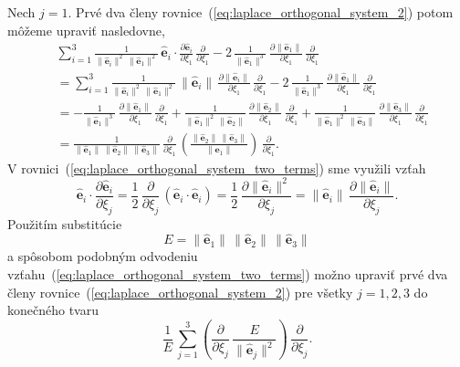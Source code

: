 \documentclass[a4paper, 12pt]{book}
\let\vec\mathbf
\begin{document}
Nech $j = 1$.  Prvé dva členy rovnice~(\ref{eq:laplace_orthogonal_system_2}) 
potom môžeme upraviť nasledovne,
%
\begin{equation}
\label{eq:laplace_orthogonal_system_two_terms}
\begin{split}
&\sum_{i = 1}^{3} \frac{1}{\| \hat{\vec e}_i \|^2 \, \| \hat{\vec e}_1 \|^2} \, 
\hat{\vec e}_i \cdot \frac{\partial \hat{\vec e}_i}{\partial \xi_1} \, 
\frac{\partial}{\partial \xi_1}
- 2\, \frac{1}{\|\hat{\vec e}_1 \|^3} \, \frac{\partial \| \hat{\vec e}_1 
\|}{\partial \xi_1} \, \frac{\partial}{\partial \xi_1}\\
%
&= \sum_{i = 1}^{3} \frac{1}{\| \hat{\vec e}_i \|^2 \, \| \hat{\vec e}_1 \|^2} 
\, \| \hat{\vec e}_i \| \, \frac{\partial \| \hat{\vec e}_i \|}{\partial \xi_1} 
\, \frac{\partial}{\partial \xi_1}
- 2\, \frac{1}{\|\hat{\vec e}_1 \|^3} \, \frac{\partial \| \hat{\vec e}_1 
\|}{\partial \xi_1} \, \frac{\partial}{\partial \xi_1}\\
%
&= -\frac{1}{\| \hat{\vec e}_1 \|^3} \, \frac{\partial \| \hat{\vec e}_1 
\|}{\partial \xi_1} \, \frac{\partial}{\partial \xi_1} + \frac{1}{\| \hat{\vec 
e}_1 \|^2 \, \| \hat{\vec e}_2 \|} \, \frac{\partial \| \hat{\vec e}_2 
\|}{\partial \xi_1} \, \frac{\partial}{\partial \xi_1} + \frac{1}{\| \hat{\vec 
e}_1 \|^2 \, \| \hat{\vec e}_3 \|} \, \frac{\partial \| \hat{\vec e}_3 
\|}{\partial \xi_1} \, \frac{\partial}{\partial \xi_1}\\
%
&= \frac{1}{\| \hat{\vec e}_1 \| \, \| \hat{\vec e}_2 \| \, \| \hat{\vec e}_3 
\|} \, \frac{\partial}{\partial \xi_1} \, \left( \frac{\| \hat{\vec e}_2 \| \, 
\| \hat{\vec e}_3 \|}{\| \hat{\vec e}_1 \|} \right) \, \frac{\partial}{\partial 
\xi_1}{.}
\end{split}
\end{equation}
%
V rovnici~(\ref{eq:laplace_orthogonal_system_two_terms}) sme využili vzťah
%
\begin{equation}
\hat{\vec e}_i \cdot \frac{\partial \hat{\vec e}_i}{\partial \xi_j} 
= \frac{1}{2} \, \frac{\partial}{\partial \xi_j} \, \left( \hat{\vec e}_i \cdot 
\hat{\vec e}_i \right) = \frac{1}{2} \, \frac{\partial \| \hat{\vec e}_i 
\|^2}{\partial \xi_j} = \| \hat{\vec e}_i \| \, \frac{\partial \| \hat{\vec 
e}_i \|}{\partial \xi_j}{.}
\end{equation}
%
Použitím substitúcie
%
\begin{equation}
\label{eq:e_laplace}
E = \| \hat{\vec e}_1  \| \, \| \hat{\vec e}_2  \| \, \| \hat{\vec e}_3  \|
\end{equation}
%
a spôsobom podobným odvodeniu 
vzťahu~(\ref{eq:laplace_orthogonal_system_two_terms}) možno upraviť prvé dva 
členy rovnice~(\ref{eq:laplace_orthogonal_system_2}) pre všetky $j = 1, 2, 3$ 
do konečného tvaru
%
\begin{equation}
\label{eq:laplace_orthogonal_system_two_terms_final}
\frac{1}{E} \, \sum_{j = 1}^3 \left( \frac{\partial}{\partial \xi_j} \, 
\frac{E}{\| \hat{\vec e}_j \|^2}\right) \, \frac{\partial}{\partial \xi_j}{.}
\end{equation}
\end{document}
